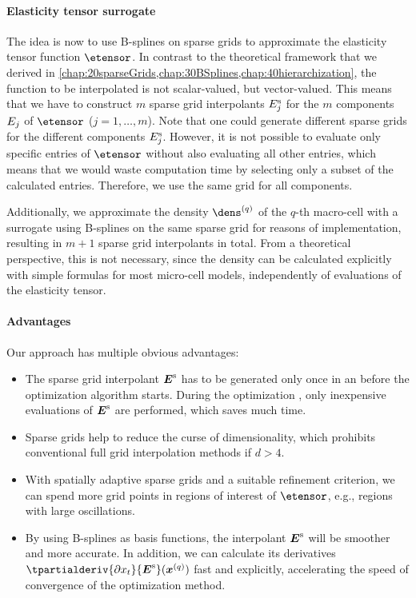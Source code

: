 \paragraph{Elasticity tensor surrogate}

The idea is now to use B-splines on sparse grids to approximate
the elasticity tensor function $\etensor$.
In contrast to the theoretical framework that we derived in
\cref{chap:20sparseGrids,chap:30BSplines,chap:40hierarchization},
the function to be interpolated is not scalar-valued, but vector-valued.
This means that we have to construct $m$ sparse grid interpolants
$E_{j}^{\mathrm{s}}$
for the $m$ components $E_{j}$ of $\etensor$ ($j = 1, \dotsc, m$).
Note that one could generate different sparse grids for the
different components $E_{j}^{\mathrm{s}}$.
However, it is not possible to evaluate only specific entries of $\etensor$
without also evaluating all other entries,
which means that we would waste computation time by selecting only
a subset of the calculated entries.
Therefore, we use the same grid for all components.

Additionally, we approximate the density $\dens^{(q)}$
of the $q$-th macro-cell with a surrogate using
B-splines on the same sparse grid for reasons of implementation,
resulting in $m + 1$ sparse grid interpolants in total.
From a theoretical perspective, this is not necessary,
since the density can be calculated explicitly with simple formulas
for most micro-cell models, independently of evaluations of the
elasticity tensor.

\paragraph{Advantages}

Our approach has multiple obvious advantages:
\begin{itemize}
  \item
  The sparse grid interpolant ${\boldsymbol{E}}^{\mathrm{s}}$ has to be generated only
  once in an  before the optimization algorithm starts.
  During the optimization ,
  only inexpensive evaluations of ${\boldsymbol{E}}^{\mathrm{s}}$ are performed,
  which saves much time.
  
  \item
  Sparse grids help to reduce the curse of dimensionality, which prohibits
  conventional full grid interpolation methods if $d > 4$.
  
  \item
  With spatially adaptive sparse grids and a suitable refinement criterion,
  we can spend more grid points in regions of interest of $\etensor$,
  e.g., regions with large oscillations.
  
  \item
  By using B-splines as basis functions,
  the interpolant ${\boldsymbol{E}}^{\mathrm{s}}$ will be smoother and more accurate.
  In addition, we can calculate its derivatives
  $\tpartialderiv{\partialdiff{} x_t}{\etensorsgintp}(\*x^{(q)})$
  fast and explicitly,
  accelerating the speed of convergence of the optimization method.
\end{itemize}



